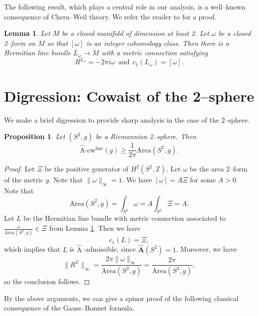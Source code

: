 \documentclass[12pt]{amsart}
\newtheorem{proposition}[theorem]{Proposition}
\newtheorem{lemma}[theorem]{Lemma}
\theoremstyle{definition}
\numberwithin{equation}{section}
\newcommand{\Z}{\mathbb{Z}}
\newcommand{\acw}{\hat{\mathrm{A}}\text{-}\mathrm{cw}}
\newcommand{\ahat}{\hat{\mathrm{A}}}
\begin{document}
The following result, which plays a central role in our analysis, is a well--known consequence of Chern--Weil theory. We refer the reader to \cite[\S1.8]{Moore:SW} for a proof.

\begin{lemma}\label{lem:prescribe-curvature}
Let $M$ be a closed manifold of dimension at least 2. Let $\omega$ be a closed 2--form on $M$ so that $[\omega]$ is an integer cohomology class. Then there is a Hermitian line bundle $L_{\omega} \to M$ with a metric connection satisfying
\[ R^{L_{\omega}} = -2\pi i\omega\ \ \text{and}\ \ c_1(L_{\omega}) = [\omega]. \]
\end{lemma}




\section{Digression: Cowaist of the 2--sphere}\label{sec:s2}
We make a brief digression to provide sharp analysis in the case of the 2--sphere.

\begin{proposition}\label{prop:s2}
Let $(S^2, g)$ be a Riemannian 2--sphere. Then
\[ \acw^{\mathrm{line}}(g) \geq \frac{1}{2\pi}\mathrm{Area}(S^2, g). \]
\end{proposition}
\begin{proof}
Let $\Xi$ be the positive generator of $H^2(S^2, \Z)$. Let $\omega$ be the area 2--form of the metric $g$. Note that $\|\omega\|_{\infty} = 1$. We have $[\omega] = A\Xi$ for some $A > 0$. Note that
\[ \mathrm{Area}(S^2, g) = \int_{S^2} \omega = A\int_{S^2}\Xi = A. \]
Let $L$ be the Hermitian line bundle with metric connection associated to $\frac{\omega}{\mathrm{Area}(S^2, g)} \in \Xi$ from Lemma \ref{lem:prescribe-curvature}. Then we have
\[ c_1(L) = \Xi, \]
which implies that $L$ is $\ahat$--admissible, since $\hat{\mathbf{A}}(S^2) = 1$. Moreover, we have
\begin{equation}\label{eqn:s2} \|R^L\|_{\infty} = \frac{2\pi\|\omega\|_{\infty}}{\mathrm{Area}(S^2, g)} = \frac{2\pi}{\mathrm{Area}(S^2, g)}, \end{equation}
so the conclusion follows.
\end{proof}

By the above arguments, we can give a spinor proof of the following classical consequence of the Gauss--Bonnet formula.
\end{document}
